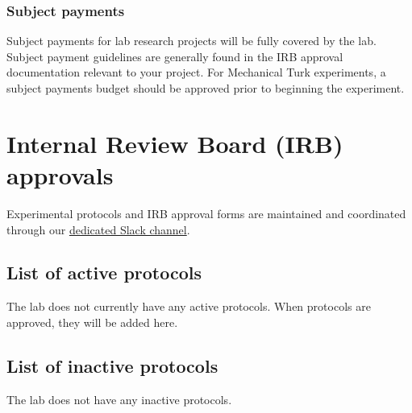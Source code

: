 \documentclass{tufte-book} %
\begin{document}
 \subsection{Subject payments}
 Subject payments for lab research projects will be fully covered by
 the lab.  Subject payment guidelines are generally found in the IRB
 approval documentation relevant to your project.  For Mechanical Turk
 experiments, a subject payments budget should be approved prior to
 beginning the experiment.


\chapter{Internal Review Board (IRB) approvals}
Experimental  protocols and IRB approval forms are maintained and
coordinated through our
\href{https://context-lab.slack.com/archives/admin}{dedicated Slack
  channel}.

 \section{List of active protocols}
The lab does not currently have any active protocols.  When protocols
are approved, they will be added here.

 \section{List of inactive protocols}
The lab does not have any inactive protocols.







\end{document}
